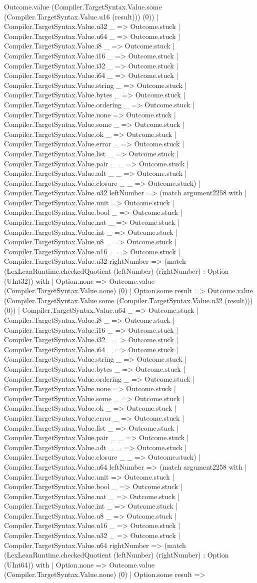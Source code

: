 \documentclass[11pt]{article}
\begin{document}
Outcome.value (Compiler.TargetSyntax.Value.some (Compiler.TargetSyntax.Value.u16 (result))) (0)) | Compiler.TargetSyntax.Value.u32 \_ => Outcome.stuck | Compiler.TargetSyntax.Value.u64 \_ => Outcome.stuck | Compiler.TargetSyntax.Value.i8 \_ => Outcome.stuck | Compiler.TargetSyntax.Value.i16 \_ => Outcome.stuck | Compiler.TargetSyntax.Value.i32 \_ => Outcome.stuck | Compiler.TargetSyntax.Value.i64 \_ => Outcome.stuck | Compiler.TargetSyntax.Value.string \_ => Outcome.stuck | Compiler.TargetSyntax.Value.bytes \_ => Outcome.stuck | Compiler.TargetSyntax.Value.ordering \_ => Outcome.stuck | Compiler.TargetSyntax.Value.none => Outcome.stuck | Compiler.TargetSyntax.Value.some \_ => Outcome.stuck | Compiler.TargetSyntax.Value.ok \_ => Outcome.stuck | Compiler.TargetSyntax.Value.error \_ => Outcome.stuck | Compiler.TargetSyntax.Value.list \_ => Outcome.stuck | Compiler.TargetSyntax.Value.pair \_ \_ => Outcome.stuck | Compiler.TargetSyntax.Value.adt \_ \_ => Outcome.stuck | Compiler.TargetSyntax.Value.closure \_ \_ => Outcome.stuck) | Compiler.TargetSyntax.Value.u32 leftNumber => (match argument2258 with | Compiler.TargetSyntax.Value.unit => Outcome.stuck | Compiler.TargetSyntax.Value.bool \_ => Outcome.stuck | Compiler.TargetSyntax.Value.nat \_ => Outcome.stuck | Compiler.TargetSyntax.Value.int \_ => Outcome.stuck | Compiler.TargetSyntax.Value.u8 \_ => Outcome.stuck | Compiler.TargetSyntax.Value.u16 \_ => Outcome.stuck | Compiler.TargetSyntax.Value.u32 rightNumber => (match (LexLeanRuntime.checkedQuotient (leftNumber) (rightNumber) : Option (UInt32)) with | Option.none => Outcome.value (Compiler.TargetSyntax.Value.none) (0) | Option.some result => Outcome.value (Compiler.TargetSyntax.Value.some (Compiler.TargetSyntax.Value.u32 (result))) (0)) | Compiler.TargetSyntax.Value.u64 \_ => Outcome.stuck | Compiler.TargetSyntax.Value.i8 \_ => Outcome.stuck | Compiler.TargetSyntax.Value.i16 \_ => Outcome.stuck | Compiler.TargetSyntax.Value.i32 \_ => Outcome.stuck | Compiler.TargetSyntax.Value.i64 \_ => Outcome.stuck | Compiler.TargetSyntax.Value.string \_ => Outcome.stuck | Compiler.TargetSyntax.Value.bytes \_ => Outcome.stuck | Compiler.TargetSyntax.Value.ordering \_ => Outcome.stuck | Compiler.TargetSyntax.Value.none => Outcome.stuck | Compiler.TargetSyntax.Value.some \_ => Outcome.stuck | Compiler.TargetSyntax.Value.ok \_ => Outcome.stuck | Compiler.TargetSyntax.Value.error \_ => Outcome.stuck | Compiler.TargetSyntax.Value.list \_ => Outcome.stuck | Compiler.TargetSyntax.Value.pair \_ \_ => Outcome.stuck | Compiler.TargetSyntax.Value.adt \_ \_ => Outcome.stuck | Compiler.TargetSyntax.Value.closure \_ \_ => Outcome.stuck) | Compiler.TargetSyntax.Value.u64 leftNumber => (match argument2258 with | Compiler.TargetSyntax.Value.unit => Outcome.stuck | Compiler.TargetSyntax.Value.bool \_ => Outcome.stuck | Compiler.TargetSyntax.Value.nat \_ => Outcome.stuck | Compiler.TargetSyntax.Value.int \_ => Outcome.stuck | Compiler.TargetSyntax.Value.u8 \_ => Outcome.stuck | Compiler.TargetSyntax.Value.u16 \_ => Outcome.stuck | Compiler.TargetSyntax.Value.u32 \_ => Outcome.stuck | Compiler.TargetSyntax.Value.u64 rightNumber => (match (LexLeanRuntime.checkedQuotient (leftNumber) (rightNumber) : Option (UInt64)) with | Option.none => Outcome.value (Compiler.TargetSyntax.Value.none) (0) | Option.some result => 
\end{document}
